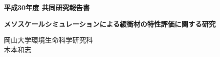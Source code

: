 ﻿\documentclass[11pt,a4j]{jarticle}
\newlength{\minitwocolumn}
\begin{document}
\newcommand{\fat}[1]{\mbox{\boldmath $#1$}}
\newcommand{\D}{\partial}
\newcommand{\w}{\omega}
\newcommand{\ga}{\alpha}
\newcommand{\gb}{\beta}
\newcommand{\gx}{\xi}
\newcommand{\gz}{\zeta}
\newcommand{\vhat}[1]{\hat{\fat{#1}}}
\newcommand{\spc}{\vspace{0.7\baselineskip}}
\newcommand{\halfspc}{\vspace{0.3\baselineskip}}

\pagestyle{empty}
\newcommand{\twofig}[2]
 {
   \begin{figure}[h]
     \begin{minipage}[t]{\minitwocolumn}
         \begin{center}   #1
         \end{center}
     \end{minipage}
         \hspace{\columnsep}
     \begin{minipage}[t]{\minitwocolumn}
         \begin{center} #2
         \end{center}
     \end{minipage}
   \end{figure}
 }
\begin{center}
{\Large \bf 平成30年度 共同研究報告書}
\end{center}
\vspace{2mm}
\begin{center}
{\LARGE \bf 
メソスケールシミュレーションによる緩衝材の特性評価に関する研究} 
\end{center}
\begin{center}
岡山大学環境生命科学研究科\\
木本和志
\end{center}
\vspace{10mm}
\end{document}

